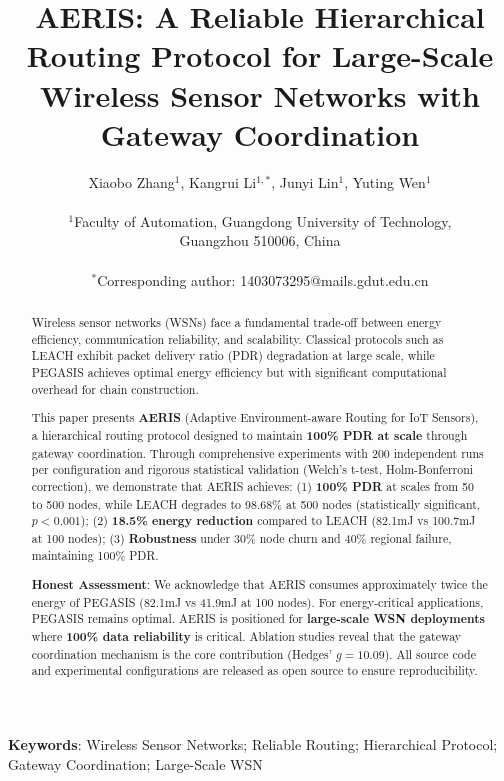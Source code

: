 \documentclass[twocolumn]{article}
\title{AERIS: A Reliable Hierarchical Routing Protocol for Large-Scale Wireless Sensor Networks with Gateway Coordination}
\author{
    Xiaobo Zhang$^{1}$,
    Kangrui Li$^{1,*}$,
    Junyi Lin$^{1}$,
    Yuting Wen$^{1}$ \\
    \\
    $^{1}$Faculty of Automation, Guangdong University of Technology, \\
    Guangzhou 510006, China \\
    \\
    $^{*}$Corresponding author: 1403073295@mails.gdut.edu.cn
}
\date{}
\begin{document}
\maketitle

\begin{abstract}
Wireless sensor networks (WSNs) face a fundamental trade-off between energy
efficiency, communication reliability, and scalability. Classical protocols
such as LEACH exhibit packet delivery ratio (PDR) degradation at large scale,
while PEGASIS achieves optimal energy efficiency but with significant
computational overhead for chain construction.

This paper presents \textbf{AERIS} (Adaptive Environment-aware Routing for
IoT Sensors), a hierarchical routing protocol designed to maintain
\textbf{100\% PDR at scale} through gateway coordination. Through
comprehensive experiments with 200 independent runs per configuration and
rigorous statistical validation (Welch's t-test, Holm-Bonferroni correction),
we demonstrate that AERIS achieves:
(1) \textbf{100\% PDR} at scales from 50 to 500 nodes, while LEACH degrades
to 98.68\% at 500 nodes (statistically significant, $p<0.001$);
(2) \textbf{18.5\% energy reduction} compared to LEACH (82.1mJ vs 100.7mJ
at 100 nodes);
(3) \textbf{Robustness} under 30\% node churn and 40\% regional failure,
maintaining 100\% PDR.

\textbf{Honest Assessment}: We acknowledge that AERIS consumes approximately
twice the energy of PEGASIS (82.1mJ vs 41.9mJ at 100 nodes). For energy-critical
applications, PEGASIS remains optimal. AERIS is positioned for \textbf{large-scale
WSN deployments} where \textbf{100\% data reliability} is critical. Ablation
studies reveal that the gateway coordination mechanism is the core contribution
(Hedges' $g=10.09$). All source code and experimental configurations are
released as open source to ensure reproducibility.
\end{abstract}

\textbf{Keywords}: Wireless Sensor Networks; Reliable Routing; Hierarchical
Protocol; Gateway Coordination; Large-Scale WSN


\end{document}
